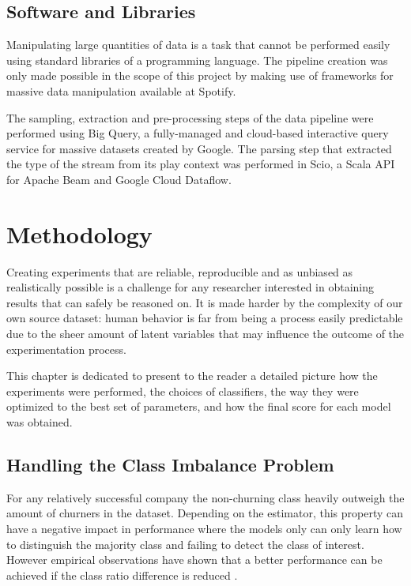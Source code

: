\documentclass{kththesis}
\begin{document}
\section{Software and Libraries}

Manipulating large quantities of data is a task that cannot be performed easily using standard libraries of a programming language. The pipeline creation was only made possible in the scope of this project by making use of frameworks for massive data manipulation available at Spotify.

The sampling, extraction and pre-processing steps of the data pipeline were performed using Big Query\citep{sato2012inside}, a fully-managed and cloud-based interactive query service for massive datasets created by Google. The parsing step that extracted the type of the stream from its play context was performed in Scio\citep{scio}, a Scala API for Apache Beam and Google Cloud Dataflow.

\chapter{Methodology}
\label{cha:method}

Creating experiments that are reliable, reproducible and as unbiased as realistically possible is a challenge for any researcher interested in obtaining results that can safely be reasoned on. It is made harder by the complexity of our own source dataset: human behavior is far from being a process easily predictable due to the sheer amount of latent variables that may influence the outcome of the experimentation process.

This chapter is dedicated to present to the reader a detailed picture how the experiments were performed, the choices of classifiers, the way they were optimized to the best set of parameters, and how the final score for each model was obtained.

\section{Handling the Class Imbalance Problem}

For any relatively successful company the non-churning class heavily outweigh the amount of churners in the dataset. Depending on the estimator, this property can have a negative impact in performance where the models only can only learn how to distinguish the majority class and failing to detect the class of interest. However empirical observations have shown that a better performance can be achieved if the class ratio difference is reduced \citep{Burez2009} \citep{ling1998data}. 
\end{document}
